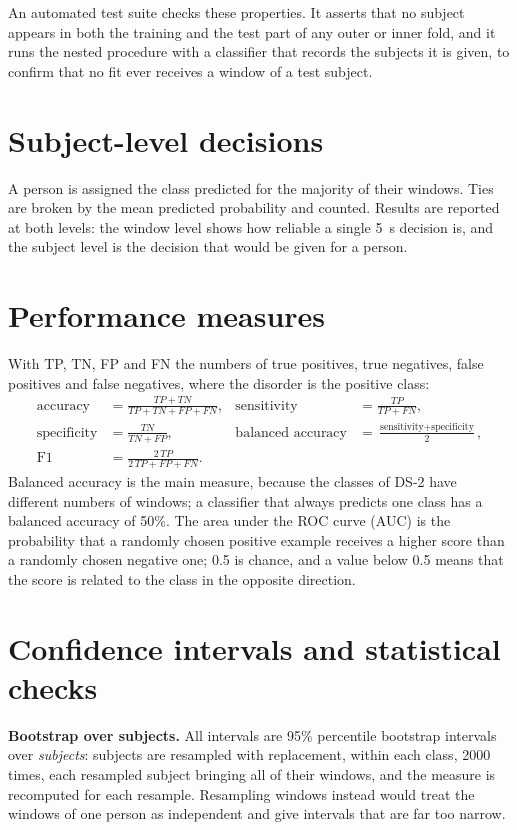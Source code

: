 An automated test suite checks these properties. It asserts that no subject appears in both the
training and the test part of any outer or inner fold, and it runs the nested procedure with a
classifier that records the subjects it is given, to confirm that no fit ever receives a window
of a test subject.

\section{Subject-level decisions}
A person is assigned the class predicted for the majority of their windows. Ties are broken by
the mean predicted probability and counted. Results are reported at both levels: the window
level shows how reliable a single 5~s decision is, and the subject level is the decision that
would be given for a person.

\section{Performance measures}
With TP, TN, FP and FN the numbers of true positives, true negatives, false positives and false
negatives, where the disorder is the positive class:
\begin{align}
\text{accuracy} &= \frac{TP+TN}{TP+TN+FP+FN}, &
\text{sensitivity} &= \frac{TP}{TP+FN}, \nonumber\\
\text{specificity} &= \frac{TN}{TN+FP}, &
\text{balanced accuracy} &= \frac{\text{sensitivity}+\text{specificity}}{2}, \\
\text{F1} &= \frac{2\,TP}{2\,TP+FP+FN}. \nonumber
\end{align}
Balanced accuracy is the main measure, because the classes of DS-2 have different numbers of
windows; a classifier that always predicts one class has a balanced accuracy of 50\%. The area
under the ROC curve (AUC) is the probability that a randomly chosen positive example receives a
higher score than a randomly chosen negative one; 0.5 is chance, and a value below 0.5 means
that the score is related to the class in the opposite direction.

\section{Confidence intervals and statistical checks}
\textbf{Bootstrap over subjects.} All intervals are 95\% percentile bootstrap
intervals~\cite{efron1993} over \emph{subjects}: subjects are resampled with replacement, within
each class, 2000 times, each resampled subject bringing all of their windows, and the measure is
recomputed for each resample. Resampling windows instead would treat the windows of one person
as independent and give intervals that are far too narrow.

